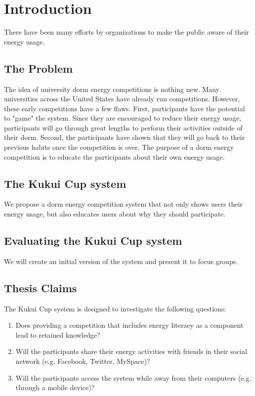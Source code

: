 
\chapter{Introduction}
There have been many efforts by organizations to make the public aware of their energy usage.

\section{The Problem}

The idea of university dorm energy competitions is nothing new.  Many universities across the United States have already run competitions.  However, these early competitions have a few flaws.  First, participants have the potential to "game" the system.  Since they are encouraged to reduce their energy usage, participants will go through great lengths to perform their activities outside of their dorm.  Second, the participants have shown that they will go back to their previous habits once the competition is over.  The purpose of a dorm energy competition is to educate the participants about their own energy usage.

\section{The Kukui Cup system}

We propose a dorm energy competition system that not only shows users their energy usage, but also educates users about why they should participate.

\section{Evaluating the Kukui Cup system}

We will create an initial version of the system and present it to focus groups.

\section{Thesis Claims}

The Kukui Cup system is designed to investigate the following questions:
\begin{enumerate}
\item Does providing a competition that includes energy literacy as a component lead to retained knowledge?
\item Will the participants share their energy activities with friends in their social network (e.g. Facebook, Twitter, MySpace)?
\item Will the participants access the system while away from their computers (e.g. through a mobile device)?
\end{enumerate}

